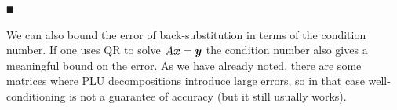 \ensuremath{\QED}

We can also bound the error of back-substitution in terms of the condition number. If one uses QR to solve $A \bm{{\mbox{\boldmath$x$\unboldmath}}} = \bm{{\mbox{\boldmath$y$\unboldmath}}}$ the condition number also gives a meaningful bound on the error.  As we have already noted, there are some matrices where PLU decompositions introduce large errors, so in that case well-conditioning is not a guarantee  of accuracy (but it still usually works).



